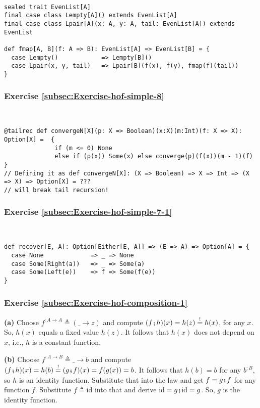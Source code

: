 ~
\begin{lstlisting}
sealed trait EvenList[A]
final case class Lempty[A]() extends EvenList[A]
final case class Lpair[A](x: A, y: A, tail: EvenList[A]) extends EvenList

def fmap[A, B](f: A => B): EvenList[A] => EvenList[B] = {
  case Lempty()            => Lempty[B]()
  case Lpair(x, y, tail)   => Lpair[B](f(x), f(y), fmap(f)(tail))
}
\end{lstlisting}



\subsubsection*{Exercise \ref{subsec:Exercise-hof-simple-8}}

~
\begin{lstlisting}
@tailrec def convergeN[X](p: X => Boolean)(x:X)(m:Int)(f: X => X): Option[X] =  {
              if (m <= 0) None
              else if (p(x)) Some(x) else converge(p)(f(x))(m - 1)(f)             }
// Defining it as def convergeN[X]: (X => Boolean) => X => Int => (X => X) => Option[X] = ???
// will break tail recursion!
\end{lstlisting}


\subsubsection*{Exercise \ref{subsec:Exercise-hof-simple-7-1}}

~
\begin{lstlisting}
def recover[E, A]: Option[Either[E, A]] => (E => A) => Option[A] = {
  case None             => _ => None
  case Some(Right(a))   => _ => Some(a)
  case Some(Left(e))    => f => Some(f(e))
}
\end{lstlisting}


\subsubsection*{Exercise \ref{subsec:Exercise-hof-composition-1}}

\textbf{(a)} Choose $f^{:A\rightarrow A}\triangleq(\_\rightarrow z)$
and compute $(f\bef h)(x)=h(z)\overset{!}{=}h(x)$, for any $x$.
So, $h(x)$ equals a fixed value $h(z)$. It follows that $h(x)$
does not depend on $x$, i.e., $h$ is a constant function.

\textbf{(b)} Choose $f^{:A\rightarrow B}\triangleq\_\rightarrow b$
and compute $(f\bef h)(x)=h(b)\overset{!}{=}(g\bef f)(x)=f(g(x))=b$.
It follows that $h(b)=b$ for any $b^{:B}$, so $h$ is an identity
function. Substitute that into the law and get $f=g\bef f$ for any
function $f$. Substitute $f\triangleq\text{id}$ into that and derive
$\text{id}=g\bef\text{id}=g$. So, $g$ is the identity function.

